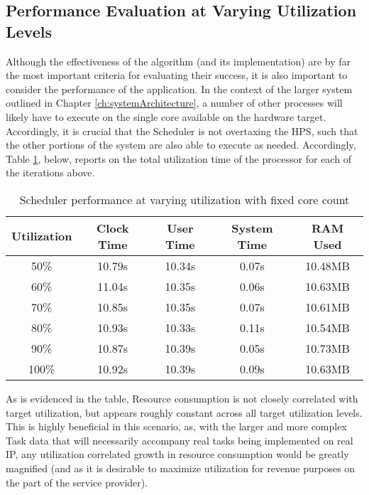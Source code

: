 \subsection{Performance Evaluation at Varying Utilization Levels}\label{subsec:performanceDataUtilVary}
Although the effectiveness of the algorithm (and its implementation) are by far the most important criteria for evaluating their success, it is also important to consider the performance of the application. In the context of the larger system outlined in Chapter \ref{ch:systemArchitecture}, a number of other processes will likely have to execute on the single core available on the hardware target. Accordingly, it is crucial that the Scheduler is not overtaxing the HPS, such that the other portions of the system are also able to execute as needed. Accordingly, Table \ref{table:SchedPerfUtilVary}, below, reports on the total utilization time of the processor for each of the iterations above.

\begin{table}[ht!]
    \centering\begin{tabular}{| c | c | c | c | c |}
        \hline
        Utilization & Clock Time & User Time & System Time & RAM Used \\
        \hline
        50\% & 10.79s & 10.34s & 0.07s & 10.48MB \\
        60\% & 11.04s & 10.35s & 0.06s & 10.63MB \\
        70\% & 10.85s & 10.35s & 0.07s & 10.61MB \\
        80\% & 10.93s & 10.33s & 0.11s & 10.54MB \\
        90\% & 10.87s & 10.39s & 0.05s & 10.73MB \\
        100\% & 10.92s & 10.39s & 0.09s & 10.63MB \\
        \hline
    \end{tabular}
    \caption{Scheduler performance at varying utilization with fixed core count}
    \label{table:SchedPerfUtilVary}
\end{table}

As is evidenced in the table, Resource consumption is not closely correlated with target utilization, but appears roughly constant across all target utilization levels. This is highly beneficial in this scenario, as, with the larger and more complex Task data that will necessarily accompany real tasks being implemented on real IP, any utilization correlated growth in resource consumption would be greatly magnified (and as it is desirable to maximize utilization for revenue purposes on the part of the service provider). 

